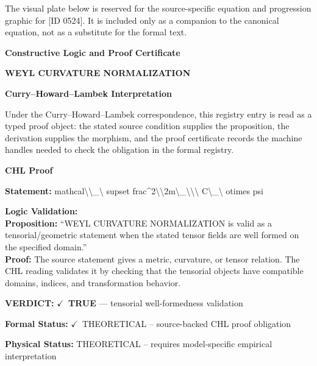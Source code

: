 \begingroup\footnotesize\sloppy
The visual plate below is reserved for the source-specific equation and progression graphic for [ID 0524]. It is included only as a companion to the canonical equation, not as a substitute for the formal text.
\par\endgroup
\ifTZPDarkEdition
{}
\fi

\clearpage
\begingroup\tzpsupportsetup
\noindent\textbf{\fontsize{10.8pt}{12.8pt}\selectfont [ID 0524] Constructive Logic and Proof Certificate}\par
\noindent\textbf{\fontsize{10pt}{12pt}\selectfont WEYL CURVATURE NORMALIZATION}\par
\vspace{0.45em}
\begingroup
\footnotesize
\setlength{\parskip}{0.22em}
\setlength{\parindent}{0pt}
\noindent\textbf{Curry--Howard--Lambek Interpretation}\par
Under the Curry--Howard--Lambek correspondence, this registry entry is read as a typed proof
object: the stated source condition supplies the proposition, the derivation supplies the
morphism, and the proof certificate records the machine handles needed to check the obligation
in the formal registry.

\vspace{0.45em}
\noindent\textbf{CHL Proof}\par
\textbf{Statement:} mathcal\textbackslash{}\textbackslash{}\_\textbackslash{} supset frac\textasciicircum{}2\textbackslash{}\textbackslash{}2m\textbackslash{}\_\textbackslash{}\textbackslash{}\textbackslash{} C\textbackslash{}\_\textbackslash{} otimes psi

\textbf{Logic Validation:}\\
\textbf{Proposition:} ``WEYL CURVATURE NORMALIZATION is valid as a tensorial/geometric statement when the stated
tensor fields are well formed on the specified domain.''\\
\textbf{Proof:} The source statement gives a metric, curvature, or tensor relation. The CHL reading
validates it by checking that the tensorial objects have compatible domains, indices,
and transformation behavior.

\textbf{VERDICT:} \ensuremath{\checkmark}\ \textbf{TRUE} --- tensorial well-formedness validation

\textbf{Formal Status:} \ensuremath{\checkmark}\ THEORETICAL -- source-backed CHL proof obligation

\textbf{Physical Status:} THEORETICAL -- requires model-specific empirical interpretation
\par\vspace{0.45em}
\par
\ifTZPDarkEdition
{}
\fi
\endgroup
\endgroup
